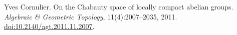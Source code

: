 Yves Cornulier.
\newblock On the {Chabauty} space of locally compact abelian groups.
\newblock \emph{Algebraic \& Geometric Topology}, 11(4):2007--2035, 2011.
\newblock \href{https://doi.org/10.2140/agt.2011.11.2007}{doi:10.2140/agt.2011.11.2007}.


